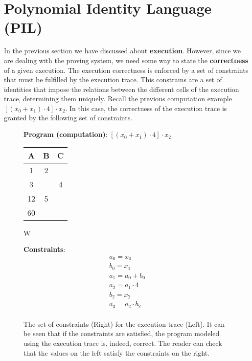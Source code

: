 



\section{Polynomial Identity Language (PIL)}

In the previous section we have discussed about \textbf{execution}. However, since we are dealing with the proving system, we need some way to state the \textbf{correctness} of a given execution. The execution correctness is enforced by a set of constraints that must be fulfilled by the execution trace. This constrains are a set of identities that impose the relations between the different cells of the execution trace, determining them uniquely. Recall the previous computation example $[(x_0+x_1)\cdot 4]\cdot x_2$. In this case, the correctness of the execution trace is granted by the following set of constraints.

\vspace{1em}


\begin{figure}[ht]
\begin{minipage}[t]{0.5\linewidth}
\centering
\textbf{Program (computation)}: $[(x_0+x_1)\cdot 4]\cdot x_2$ \\
\vspace{1em}
\begin{tabular}{|c|c|c|}
\hline
\textbf{A} & \textbf{B} & \cellcolor{lightgray} \textbf{C} \\ \hline
1 & 2 & \cellcolor{lightgray} \\ \hline
3 & & \cellcolor{lightgray} 4 \\ \hline
12 & 5 & \cellcolor{lightgray} \\ \hline
60 & & \cellcolor{lightgray} \\ \hline
\end{tabular}

\caption{W}

\end{minipage}
\hfill
\begin{minipage}[t]{0.5\linewidth}
\centering
\textbf{Constraints}:
\begin{gather*}
a_0 = x_0 \\
b_0 = x_1 \\
a_1 = a_0 + b_0 \\
a_2 = a_1 \cdot 4 \\
b_2 = x_2 \\
a_3 = a_2 \cdot b_2 \\
\end{gather*}

\end{minipage}

\caption{The set of constraints (Right) for the execution trace (Left). It can be seen that if the constraints are satisfied, the program modeled using the execution trace is, indeed, correct. The reader can check that the values on the left satisfy the constraints on the right. }
\label{fig:execution-constraints}

\end{figure}

